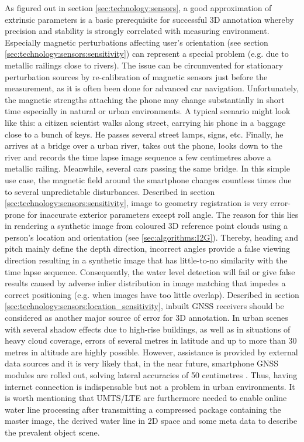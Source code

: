 \documentclass[review]{elsarticle}
\begin{document}
As figured out in section \ref{sec:technology:sensors}, a good approximation of extrinsic parameters is a basic prerequisite for successful 3D annotation whereby precision and stability is strongly correlated with measuring environment. Especially magnetic perturbations affecting user's orientation (see section \ref{sec:technology:sensors:sensitivity}) can represent a special problem (e.g. due to metallic railings close to rivers). The issue can be circumvented for stationary perturbation sources by re-calibration of magnetic sensors just before the measurement, as it is often been done for advanced car navigation. Unfortunately, the magnetic strengths attaching the phone may change substantially in short time especially in natural or urban environments. A typical scenario might look like this: a citizen scientist walks along street, carrying his phone in a baggage close to a bunch of keys. He passes several street lamps, signs, etc. Finally, he arrives at a bridge over a urban river, takes out the phone, looks down to the river and records the time lapse image sequence a few centimetres above a metallic railing. Meanwhile, several cars passing the same bridge. In this simple use case, the magnetic field around the smartphone changes countless times due to several unpredictable disturbances. Described in section \ref{sec:technology:sensors:sensitivity}, image to geometry registration is very error-prone for inaccurate exterior parameters except roll angle. The reason for this lies in rendering a synthetic image from coloured 3D reference point clouds using a person's location and orientation (see \ref{sec:algorithms:I2G}). Thereby, heading and pitch mainly define the depth direction, incorrect angles provide a false viewing direction resulting in a synthetic image that has little-to-no similarity with the time lapse sequence. Consequently, the water level detection will fail or give false results caused by adverse inlier distribution in image matching that impedes a correct positioning (e.g. when images have too little overlap). Described in section \ref{sec:technology:sensors:location_sensitivity}, inbuilt \gls{GNSS} receivers should be considered as another major source of error for 3D annotation. In urban scenes with several shadow effects due to high-rise buildings, as well as in situations of heavy cloud coverage, errors of several metres in latitude and up to more than 30 metres in altitude are highly possible. However, assistance is provided by external data sources and it is very likely that, in the near future, smartphone \gls{GNSS} modules are rolled out, solving lateral accuracies of 50 centimetres \cite{Moore2017}. Thus, having internet connection is indispensable but not a problem in urban environments. It is worth mentioning that UMTS/LTE are furthermore needed to enable online water line processing after transmitting a compressed package containing the master image, the derived water line in 2D space and some meta data to describe the prevalent object scene.
\end{document}

